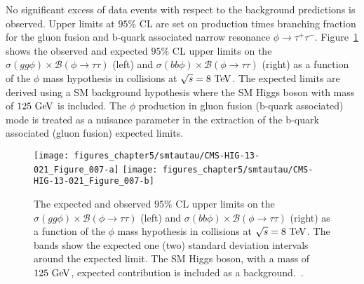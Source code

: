No significant excess of data events with respect to the background predictions is observed. Upper limits at $95\%$ CL are set on production times branching fraction for the gluon fusion and b-quark associated narrow resonance $\phi \rightarrow \tau^{+}\tau^{-}$. Figure~\ref{fig:mssmtautau} shows  the observed and expected $95\%$ CL upper limits on the $\sigma(gg\phi) \times \mathcal{B}(\phi \rightarrow\tau\tau)$ (left) and $\sigma(bb\phi) \times \mathcal{B}(\phi \rightarrow \tau\tau)$ (right) as a function of the $\phi$ mass hypothesis in collisions at $\sqrt{s}=8~\mathrm{Te\kern -0.1em V}$. The expected limits are derived using a SM background hypothesis where the SM Higgs boson with mass of $125~\mathrm{Ge\kern -0.1em V}$ is included. The $\phi$ production in gluon fusion (b-quark associated) mode is treated as a nuisance parameter in the extraction of the b-quark associated (gluon fusion) expected limits.  
\begin{figure}[htbp]
\centering
\texttt{[image: figures\_chapter5/smtautau/CMS-HIG-13-021\_Figure\_007-a]}
\texttt{[image: figures\_chapter5/smtautau/CMS-HIG-13-021\_Figure\_007-b]}
\caption{The expected and observed $95\%$ CL upper limits on the $\sigma(gg\phi) \times \mathcal{B}(\phi \rightarrow\tau\tau)$ (left) and $\sigma(bb\phi) \times \mathcal{B}(\phi \rightarrow \tau\tau)$ (right) as a function of the $\phi$ mass hypothesis in collisions at $\sqrt{s}=8~\mathrm{Te\kern -0.1em V}$. The bands show the expected one (two) standard deviation intervals around the expected limit. The SM Higgs boson, with a mass of $125~\mathrm{Ge\kern -0.1em V}$, expected contribution is included as a background.~\cite{Khachatryan:2014wca}.}
\label{fig:mssmtautau}
\end{figure}

